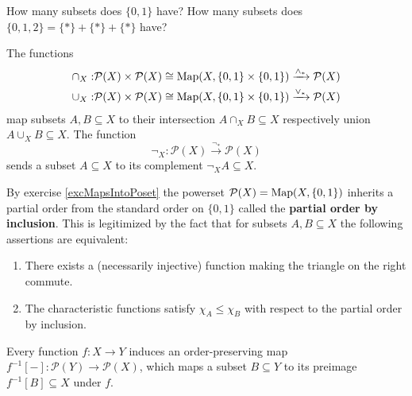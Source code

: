 \documentclass{article}
\begin{document}
	\begin{exercise}
		How many subsets does $\{0,1\}$ have? How many subsets does $\{0,1,2\} = \{\ast\}+\{\ast\}+\{\ast\}$ have?
	\end{exercise}

	\begin{remark}
		The functions
		\begin{align*}
			\cap_X:&\mathcal{P}(X)\times\mathcal{P}(X)\cong \operatorname{Map}(X,\{0,1\}\times\{0,1\}) \xrightarrow{\land_\ast} \mathcal{P}(X)\\
			\cup_X:&\mathcal{P}(X)\times\mathcal{P}(X)\cong \operatorname{Map}(X,\{0,1\}\times\{0,1\}) \xrightarrow{\lor_\ast} \mathcal{P}(X)
		\end{align*}
		map subsets $A,B\subseteq X$ to their intersection $A\cap_X B \subseteq X$ respectively union $A \cup_X B \subseteq X$. The function
		\begin{equation*}
			\lnot_X: \mathcal{P}(X) \xrightarrow{\lnot_\ast} \mathcal{P}(X)
		\end{equation*}
		sends a subset $A\subseteq X$ to its complement $\lnot_X A \subseteq X$.
	\end{remark}	


	\begin{remark}
		By exercise \ref{excMapsIntoPoset} the powerset $\mathcal{P}(X)=\operatorname{Map}(X,\{0,1\})$ inherits a partial order from the standard order on $\{0,1\}$ called the \textbf{partial order by inclusion}. This is legitimized by the fact that for subsets $A,B\subseteq X$ the following assertions are equivalent:
		\begin{enumerate}
			\item{
				There exists a (necessarily injective) function making the triangle on the right commute. 
			}
			\item{
				The characteristic functions satisfy $\chi_A \leq \chi_B$ with respect to the partial order by inclusion.
			}
		\end{enumerate}
	\end{remark}



	\begin{exercise2}
		Every function $f:X\rightarrow Y$ induces an order-preserving map $f^{-1}[-]:\mathcal{P}(Y)\rightarrow\mathcal{P}(X)$, which maps a subset $B\subseteq Y$ to its preimage $f^{-1}[B] \subseteq X$ under $f$.

	\end{exercise2}
\end{document}
